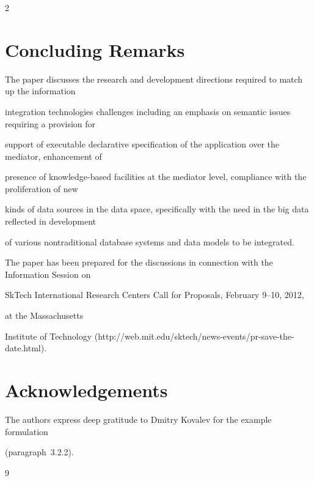 \begin{multicols}{2}
\section{Concluding Remarks}



\noindent

The paper discusses the research and development directions required to match up the information 

integration technologies challenges including an emphasis on semantic issues requiring a provision for 

support of executable declarative specification of the application over the mediator, enhancement of 

presence of knowledge-based facilities at the mediator level, compliance with the proliferation of new 

kinds of data sources in the data space, specifically with the need in the big data reflected in development 

of various nontraditional database systems and data models to be integrated.



The paper has been prepared for the discussions in connection with the Information Session on 

SkTech International Research Centers Call for Proposals, February 9--10, 2012, 

at the Massachusetts 

Institute of Technology ({\sf http://web.mit.edu/sktech/news-events/pr-save-the-date.html}). 







\section*{Acknowledgements}

The authors express deep gratitude to Dmitry Kovalev for the example formulation 

(paragraph~3.2.2).

 

 {\small\frenchspacing

{%


\begin{thebibliography}{9}




\end{thebibliography}}}
\end{multicols}
